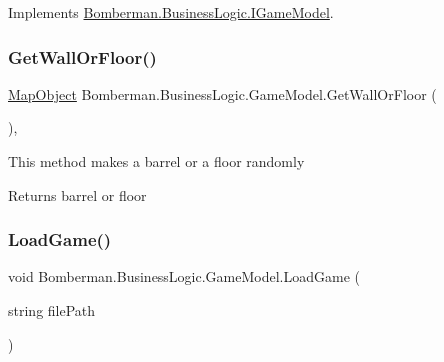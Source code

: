 Implements \mbox{\hyperlink{interface_bomberman_1_1_business_logic_1_1_i_game_model_ad00b9948871adc4b67dc0ef4ed6960ab}{Bomberman.\+Business\+Logic.\+I\+Game\+Model}}.

\mbox{\label{class_bomberman_1_1_business_logic_1_1_game_model_ae901c4a65a88329263aab41f5670b29d}} 
\subsubsection{\texorpdfstring{GetWallOrFloor()}{GetWallOrFloor()}}
{\footnotesize\ttfamily \mbox{\hyperlink{class_bomberman_1_1_model_1_1_map_object}{Map\+Object}} Bomberman.\+Business\+Logic.\+Game\+Model.\+Get\+Wall\+Or\+Floor (\begin{DoxyParamCaption}{ }\end{DoxyParamCaption})\hspace{0.3cm}{\ttfamily [inline]}, {\ttfamily [private]}}



This method makes a barrel or a floor randomly 

\begin{DoxyReturn}{Returns}
barrel or floor 
\end{DoxyReturn}
\mbox{\label{class_bomberman_1_1_business_logic_1_1_game_model_a77b69dcba720a486db46fadeeb56845b}} 
\subsubsection{\texorpdfstring{LoadGame()}{LoadGame()}}
{\footnotesize\ttfamily void Bomberman.\+Business\+Logic.\+Game\+Model.\+Load\+Game (\begin{DoxyParamCaption}\item[{string}]{file\+Path }\end{DoxyParamCaption})\hspace{0.3cm}{\ttfamily [inline]}}



